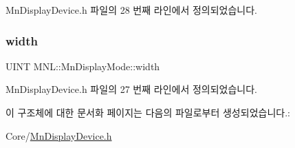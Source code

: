 Mn\+Display\+Device.\+h 파일의 28 번째 라인에서 정의되었습니다.

\mbox{\label{struct_m_n_l_1_1_mn_display_mode_a483b98018ae07b10bfbf3c42d234550e}} 
\subsubsection{\texorpdfstring{width}{width}}
{\footnotesize\ttfamily U\+I\+NT M\+N\+L\+::\+Mn\+Display\+Mode\+::width}



Mn\+Display\+Device.\+h 파일의 27 번째 라인에서 정의되었습니다.



이 구조체에 대한 문서화 페이지는 다음의 파일로부터 생성되었습니다.\+:\begin{DoxyCompactItemize}
\item 
Core/\hyperlink{_mn_display_device_8h}{Mn\+Display\+Device.\+h}\end{DoxyCompactItemize}
